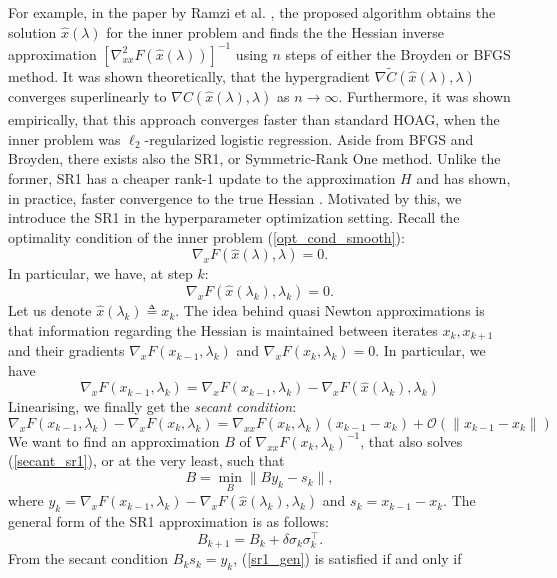 \documentclass[11pt, twoside]{report}
\begin{document}
For example, in the paper by Ramzi et al. \cite{ramzi2022shine}, the proposed algorithm obtains the solution $\hat{x}(\lambda)$ for the inner problem and finds the the Hessian inverse  approximation $\left[ \nabla^2_{xx} F(\hat{x}(\lambda)) \right]^{-1}$ using $n$ steps of either the Broyden or BFGS method. It was shown theoretically, that the hypergradient $\nabla \tilde{C}(\hat{x}(\lambda), \lambda)$ converges superlinearly to $\nabla C(\hat{x}(\lambda), \lambda)$ as $n \xrightarrow[]{} \infty.$ Furthermore, it was shown empirically, that this approach converges faster than standard HOAG, when the inner problem was $\ell_2$-regularized logistic regression. Aside from BFGS and Broyden, there exists also the SR1, or Symmetric-Rank One method. Unlike the former, SR1 has a cheaper rank-1 update to the approximation $H$ and has shown, in practice, faster convergence to the true Hessian \cite{khalfan1993symmetric}. Motivated by this, we introduce the SR1 in the hyperparameter optimization setting. Recall the optimality condition of the inner problem (\ref{opt_cond_smooth}):
\[\nabla_x F(\hat{x}(\lambda),\lambda) = 0.\]
In particular, we have, at step $k$:
\[\nabla_x F(\hat{x}(\lambda_k),\lambda_k) = 0.\]
Let us denote $\hat{x}(\lambda_{k}) \triangleq x_k$. The idea behind quasi Newton approximations is that information regarding the Hessian is maintained between iterates $x_k,x_{k+1}$ and their gradients $\nabla_x F(x_{k-1},\lambda_{k})$ and $\nabla_x F(x_{k},\lambda_{k}) = 0$. In particular, we have
\[\nabla_x F(x_{k-1},\lambda_{k}) = \nabla_x F(x_{k-1},\lambda_{k}) - \nabla_x F(\hat{x}(\lambda_k),\lambda_k)\]
Linearising, we finally get the \textit{secant condition}:
\begin{equation}\label{secant_sr1}
    \nabla_x F(x_{k-1},\lambda_{k}) - \nabla_x F(x_k,\lambda_k) = \nabla_{xx} F(x_{k},\lambda_{k})(x_{k-1} - x_k) + \mathcal{O}(\|x_{k-1} - x_k\|)
\end{equation}
We want to find an approximation $B$ of $\nabla_{xx} F(x_{k},\lambda_{k})^{-1}$, that also solves (\ref{secant_sr1}), or at the very least, such that
\[B = \min_{B} \|By_k - s_k\|,\]
where $y_k = \nabla_x F(x_{k-1},\lambda_{k}) - \nabla_x F(\hat{x}(\lambda_k),\lambda_k)$ and $s_k = x_{k-1} - x_k$. The general form of the SR1 approximation is as follows:
\begin{equation} \label{sr1_gen}
    B_{k+1} = B_{k} + \delta\sigma_k \sigma_k^\top.
\end{equation}
From the secant condition $B_k s_k = y_k$, (\ref{sr1_gen}) is satisfied if and only if \cite{nocedal2006numerical}
\end{document}
